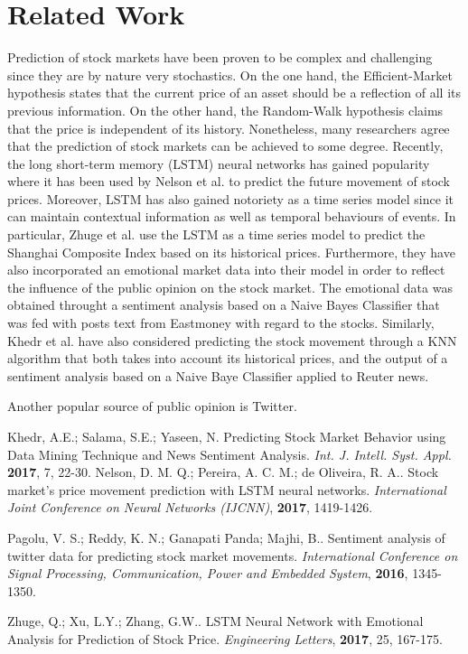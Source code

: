 \documentclass[conference]{IEEEtran}
\begin{document}
\section{Related Work}
\par Prediction of stock markets have been proven to be complex and challenging since they are by nature very stochastics. On the one hand, the Efficient-Market hypothesis states that the current price of an asset should be a reflection of all its previous information. On the other hand, the Random-Walk hypothesis claims that the price is independent of its history. Nonetheless, many researchers agree that the prediction of stock markets can be achieved to some degree.  Recently, the long short-term memory (LSTM) neural networks has gained popularity where it has been used by Nelson et al. \cite{LSTM Stock} to predict the future movement of stock prices. Moreover, LSTM has also gained notoriety as a time series model since it can maintain contextual information as well as temporal behaviours of events. In particular, Zhuge et al. \cite{LSTM Emotional} use the LSTM as a time series model to predict the Shanghai Composite Index based on its historical prices. Furthermore, they have also incorporated an emotional market data into their model in order to reflect the influence of the public opinion on the stock market. The emotional data was obtained throught a sentiment analysis based on a Naive Bayes Classifier that was fed with posts text from Eastmoney with regard to the stocks. Similarly, Khedr et al. \cite{Behavior} have also considered predicting the stock movement through a KNN algorithm that both takes into account its historical prices, and the output of a sentiment analysis based on a Naive Baye Classifier applied to Reuter news. 
\par Another popular source of public opinion is Twitter.


\begin{thebibliography}{2}
 Khedr, A.E.; Salama, S.E.; Yaseen, N. Predicting Stock Market Behavior using Data Mining Technique and News Sentiment Analysis. \textit{Int. J. Intell. Syst. Appl.} \textbf{2017}, 7, 22-30.
 Nelson, D. M. Q.; Pereira, A. C. M.; de Oliveira, R. A.. Stock market’s price movement
prediction with LSTM neural networks. \textit{International Joint Conference on Neural Networks (IJCNN)}, \textbf{2017}, 1419-1426.

 Pagolu, V. S.; Reddy, K. N.; Ganapati Panda; Majhi, B.. Sentiment
analysis of twitter data for predicting stock market
movements. \textit{International
Conference on Signal Processing, Communication,
Power and Embedded System}, \textbf{2016}, 1345-1350.

 Zhuge, Q.; Xu, L.Y.; Zhang, G.W..  LSTM Neural Network with Emotional
Analysis for Prediction of Stock Price. \textit{Engineering Letters}, \textbf{2017}, 25, 167-175.
\end{thebibliography}
\end{document}
